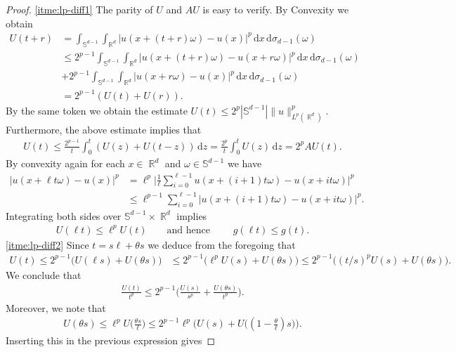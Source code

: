 \documentclass[12pt, reqno]{amsart}%
\theoremstyle{plain}  %
\theoremstyle{definition}  %
\theoremstyle{remark}
\numberwithin{equation}{section}
\DeclareMathOperator{\R}{\mathbb{R}}
\renewcommand{\d}{\,\mathrm{d}}
\begin{document}
\begin{proof}
\eqref{itme:lp-diff1} The parity of  $U$ and $AU$ is easy to verify. By Convexity  we obtain
\begin{align*}
U(t+r) &= \int_{\mathbb{S}^{d-1}} \int_{\R^d} |u(x + (t+r)\omega) - u(x)|^p \d x \d\sigma_{d-1}(\omega)\\
&\leq 2^{p-1}\int_{\mathbb{S}^{d-1}} \int_{\R^d} |u(x + (t+r)\omega) - u(x + r\omega)|^p \d x \d\sigma_{d-1}(\omega)\\
&+2^{p-1}\int_{\mathbb{S}^{d-1}} \int_{\R^d} |u(x + r\omega) - u(x)|^p \d x \d\sigma_{d-1}(\omega)\\
&=2^{p-1}(U(t)+U(r)).
\end{align*}
By the same token we obtain the estimate $U(t)\leq 2^p|\mathbb{S}^{d-1}|\|u\|^p_{L^p(\R^d)}$. Furthermore, the above  estimate  implies that
\begin{align*}
U(t)\leq \frac{2^{p-1}}{t} \int_0^t (U(z)+ U(t-z) )\d z
= \frac{2^p}{t}\int_0^t U(z)\d z = 2^p AU(t).
\end{align*}
By  convexity again  for each  $ x\in \R^d$ and $\omega\in \mathbb{S}^{d-1}$ we have
\begin{align*}
|u(x+\ell t\omega )-u(x)|^p
&= \ell ^p \big|\frac{1}{\ell}\sum_{i=0}^{\ell-1}u(x+(i+1) t\omega)-u(x+i t\omega) \big|^p\\
&\leq \ell^{p-1} \sum_{i=0}^{\ell-1}|u(x+(i+1) t\omega)-u(x+i t\omega)|^p.
\end{align*}
Integrating both sides over $\mathbb{S}^{d-1}\times \R^d$ implies
\begin{align*}
U(\ell t)\leq \ell^pU(t)\qquad \text{and hence } \qquad g(\ell t) \leq g(t).
\end{align*}
\eqref{itme:lp-diff2} Since $t= s\ell+\theta s$ we deduce from the foregoing that
\begin{align*}
U(t) \leq 2^{p-1}\big(U(\ell s) +U(\theta s)\big)
&\leq
2^{p-1}\big(\ell^p U(s) +U(\theta s)\big)\leq
2^{p-1}\big( (t/s)^p U(s) +U(\theta s)\big).
\end{align*}
We conclude that
\begin{align*}
\frac{U(t)}{t^p}\leq 2^{p-1}\Big(\frac{U(s)}{s^p}+ \frac{U(\theta s)}{t^p}\Big).
\end{align*}
Moreover, we note that
\begin{align*}
U(\theta s)\leq \ell^p U\Big(\tfrac{\theta s}{\ell}\Big)
\leq 2^{p-1}\ell^p\Big( U(s)+U\big((1-\tfrac{\theta }{\ell})s\big)\Big).
\end{align*}
Inserting this in the previous expression gives

\end{proof}
\end{document}
